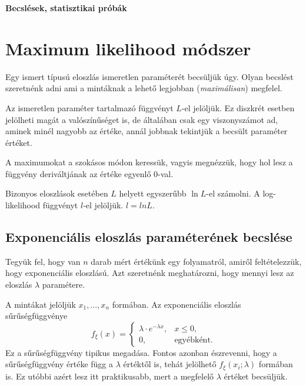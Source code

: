 \documentclass[a4paper]{article}
\begin{document}
\begin{center}
   \huge \textbf{Becslések, statisztikai próbák}
\end{center}

\vskip 1cm

\section{Maximum likelihood módszer}

Egy ismert típusú eloszlás ismeretlen paraméterét becsüljük úgy. Olyan becslést szeretnénk adni ami a mintáknak a lehető legjobban (\textit{maximálisan}) megfelel.

Az ismeretlen paraméter tartalmazó függvényt $L$-el jelöljük. Ez diszkrét esetben jelölheti magát a valószínűséget is, de általában csak egy viszonyszámot ad, aminek minél nagyobb az értéke, annál jobbnak tekintjük a becsült paraméter értéket.

A maximumokat a szokásos módon keressük, vagyis megnézzük, hogy hol lesz a függvény deriváltjának az értéke egyenlő 0-val.

Bizonyos eloszlások esetében $L$ helyett egyszerűbb $\ln L$-el számolni. A log-likelihood függvényt $l$-el jelöljük. $l = ln L$.

\subsection{Exponenciális eloszlás paraméterének becslése}

Tegyük fel, hogy van $n$ darab mért értékünk egy folyamatról, amiről feltételezzük, hogy exponenciális eloszlású.
Azt szeretnénk meghatározni, hogy mennyi lesz az eloszlás $\lambda$ paramétere.

A mintákat jelöljük $x_1, \ldots, x_n$ formában.
Az exponenciális eloszlás sűrűségfüggvénye
\[
f_{\xi}(x) = \begin{cases}
\lambda \cdot e^{-\lambda x}, & x \leq 0, \\
0, & \text{egyébként}.
\end{cases}
\]
Ez a sűrűségfüggvény tipikus megadása. Fontos azonban észrevenni, hogy a sűrűségfüggvény értéke függ a $\lambda$ értéktől is, tehát jelölhető $f_{\xi}(x_i; \lambda)$ formában is. Ez utóbbi azért lesz itt praktikusabb, mert a megfelelő $\lambda$ értéket becsüljük.
\end{document}
